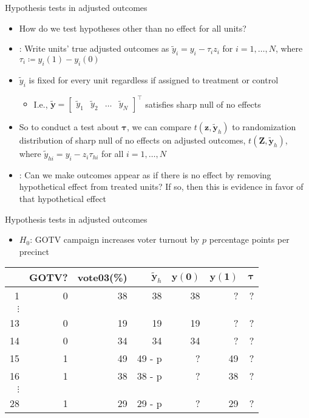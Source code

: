 \documentclass[table, xcolor = {dvipsnames}, 9pt]{beamer}
\theoremstyle{plain}
\newcommand{\mh}[1]{{\color{magenta}{#1}}}
\begin{document}
\begin{frame}{Hypothesis tests in adjusted outcomes}
\vfill
\begin{itemize} 
\item How do we test hypotheses other than no effect for all units? \vfill
\item \citet{rosenbaum2002a,rosenbaum2010,rosenbaum2017a}: Write units' true adjusted outcomes as $\tilde{y}_i = y_i - \tau_i z_i$ for $i = 1, \ldots , N$, where $\tau_i \coloneqq y_i(1) - y_i(0)$ \vfill
\item $\tilde{y}_i$ is fixed for every unit regardless if assigned to treatment or control
\begin{itemize} \vfill
\item I.e., $\bm{\tilde{y}} = \begin{bmatrix} \tilde{y}_1 & \tilde{y}_2 & \ldots & \tilde{y}_N \end{bmatrix}^{\top}$ satisfies sharp null of no effects \vfill
\end{itemize}
\item So to conduct a test about $\bm{\tau}$, we can compare $t(\bm{z}, \bm{\tilde{y}}_{h})$ to randomization distribution of sharp null of no effects on adjusted outcomes, $t(\bm{Z}, \bm{\tilde{y}}_{h})$, where $\tilde{y}_{hi} = y_i - z_i \tau_{hi}$ for all $i = 1, \ldots , N$ \vfill
\item \mh{Intuition}: Can we make outcomes appear as if there is no effect by removing hypothetical effect from treated units? If so, then this is evidence in favor of that hypothetical effect
\end{itemize}
\vfill
\end{frame}
\begin{frame}{Hypothesis tests in adjusted outcomes}
\begin{itemize}
\item $H_0$: GOTV campaign increases voter turnout by $p$ percentage points per precinct  
\end{itemize}
\begin{center}
  \begin{tabular}{r|rr|rrrr}
  \hline
 & GOTV? & vote03(\%)& $\bm{\tilde{y}}_h$ & $\bm{y}(\bm{0})$ & $\bm{y}(\bm{1})$ & $\bm{\tau}$\\
  \hline
1 & 0 & 38 & 38 & 38 & ? & ?\\
$\vdots$& & & & & & \\
13 & 0 & 19 & 19 & 19& ? & ?\\
14 & 0 & 34 & 34 & 34& ? & ?\\
15 & 1 & 49 & 49 - p & ?& 49 & ?\\
16 & 1 & 38 & 38 - p & ?& 38 & ?\\
$\vdots$& & & & & & \\
28 & 1 & 29 & 29 - p & ?& 29 & ? \\
   \hline
\end{tabular}
\end{center}
\end{frame}
\end{document}
